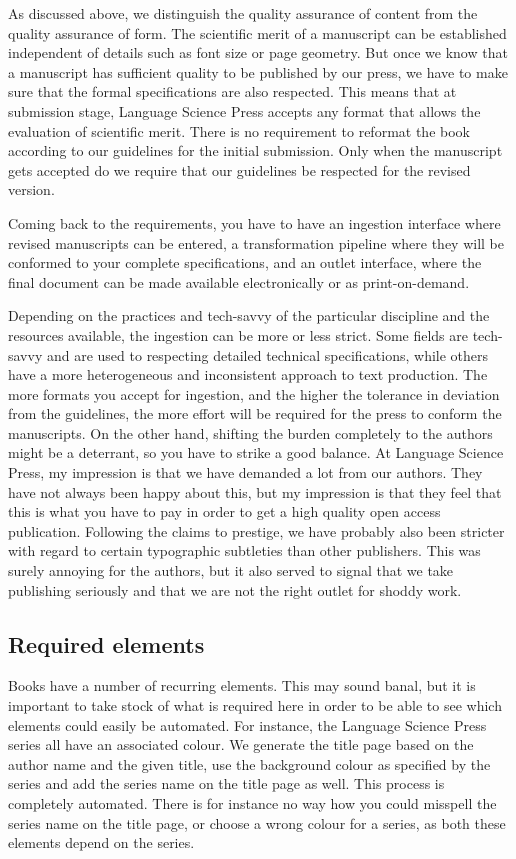 \documentclass[guidelines,nonflat,modfonts] {langsci/langscibook}
\begin{document}
As discussed above, we distinguish the quality assurance of content from the quality assurance of form. The scientific merit of a manuscript can be established independent of details such as font size or page geometry. But once we know that a manuscript has sufficient quality to be published by our press, we have to make sure that the formal specifications are also respected. This means that at submission stage, Language Science Press accepts any format that allows the evaluation of scientific merit. There is no requirement to reformat the book according to our guidelines for the initial submission. Only when the manuscript gets accepted do we require that our guidelines be respected for the revised version. 

Coming back to the requirements, you have to have an ingestion interface where revised manuscripts can be entered, a transformation pipeline where they will be conformed to your complete specifications, and an outlet interface, where the final document can be made available electronically or as print-on-demand.

Depending on the practices and tech-savvy of the particular discipline and the resources available, the ingestion can be more or less strict. Some fields are tech-savvy and are used to respecting detailed technical specifications, while others have a more heterogeneous and inconsistent approach to text production. The more formats you accept for ingestion, and the higher the tolerance in deviation from the guidelines, the more effort will be required for the press to conform the manuscripts. On the other hand, shifting the burden completely to the authors might be a deterrant, so you have to strike a good balance. At Language Science Press, my impression is that we have demanded a lot from our authors. They have not always been happy about this, but my impression is that they feel that this is what you have to pay in order to get a high quality open access publication. Following the claims to prestige, we have probably also been stricter with regard to certain typographic subtleties than other publishers. This was surely annoying for the authors, but it also served to signal that we take publishing seriously and that we are not the right outlet for shoddy work. 

\subsection{Required elements}
Books have a number of recurring elements. This may sound banal, but it is important to take stock of what is required here in order to be able to see which elements could easily be automated. For instance, the Language Science Press series all have an associated colour. We generate the title page based on the author name and the given title, use the background colour as specified by the series and add the series name on the title page as well. This process is completely automated. There is for instance no way how you could misspell the series name on the title page, or choose a wrong colour for a series, as both these elements depend on the series. 
\end{document}
